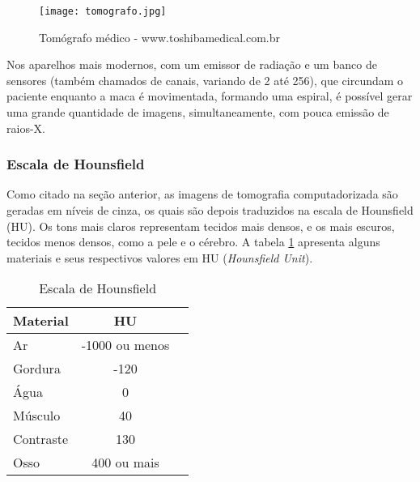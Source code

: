\begin{figure}[!htb]
\centering
\texttt{[image: tomografo.jpg]}
\caption{Tomógrafo médico - www.toshibamedical.com.br}
\end{figure}


Nos aparelhos mais modernos, com um emissor de radiação e um banco de
sensores (também chamados de canais, variando de 2 até 256), que circundam o paciente
enquanto a maca é movimentada, formando uma espiral, é possível gerar uma
grande quantidade de imagens, simultaneamente, com pouca emissão de raios-X.


\subsubsection{Escala de Hounsfield}
Como citado na seção anterior, as imagens de tomografia computadorizada
são geradas em níveis de cinza, os quais são depois traduzidos na escala
de Hounsfield (HU). Os tons mais claros representam tecidos mais densos, e
os mais escuros, tecidos menos densos, como a pele e o cérebro.
A tabela \ref{tab:escala_hounsfield} apresenta alguns materiais e seus 
respectivos valores em HU (\textit{Hounsfield Unit}).


\begin{table}[h]
\centering
\caption{Escala de Hounsfield}
\begin{tabular}{lcc}\\
\hline %
Material & HU\\
\hline
\hline
Ar & -1000 ou menos\\
Gordura & -120\\
Água & 0\\
Músculo & 40\\
Contraste & 130\\
Osso & 400 ou mais\\
\hline
\end{tabular}
\label{tab:escala_hounsfield}
\end{table}


